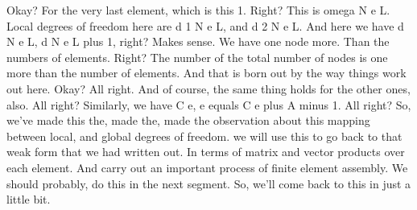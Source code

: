 \documentclass[10pt]{article}
\begin{document}
Okay? For the very last element, which is this 1. Right? This is omega N e L. Local degrees of freedom here are d 1 N e L, and d 2 N e L. And here we have d N e L, d N e L plus 1, right? Makes sense. We have one node more. Than the numbers of elements. Right? The number of the total number of nodes is one more than the number of elements. And that is born out by the way things work out here. Okay? All right. And of course, the same thing holds for the other ones, also. All right? Similarly, we have C e, e equals C e plus A minus 1. All right? So, we've made this the, made the, made the observation about this mapping between local, and global degrees of freedom.  we will use this to go back to that weak form that we had written out. In terms of matrix and vector products over each element. And carry out an important process of finite element assembly. We should probably, do this in the next segment. So, we'll come back to this in just a little bit.
\end{document}
